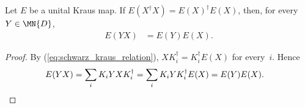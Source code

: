 \begin{theorem}
    \label{thm:right_multiplicative_identity}
    \leanok
    Let $E$ be a unital Kraus map.
    If $E(X^\dagger X) = E(X)^\dagger E(X)$, then, for every
    $Y \in \MN{D}$,
    \begin{align}
        E(YX)
        &= E(Y)E(X).
        \label{eq:schwarz_right_multiplicative}
    \end{align}
\end{theorem}

\begin{proof}
    \leanok
    By (\ref{eq:schwarz_kraus_relation}),
    $X K_i^\dagger=K_i^\dagger E(X)$ for every~$i$. Hence
    \begin{align}
        E(YX)
        &= \sum_i K_iYXK_i^\dagger
        = \sum_i K_iYK_i^\dagger E(X)
        = E(Y)E(X).
        \notag
    \end{align}
\end{proof}
